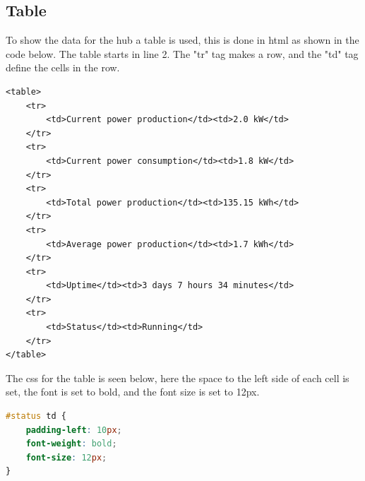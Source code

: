 \subsection{Table}
To show the data for the hub a table is used, this is done in html as shown in the code below. The table starts in line 2. The "tr" tag makes a row, and the "td" tag define the cells in the row.
\begin{lstlisting}
<table>
	<tr>
		<td>Current power production</td><td>2.0 kW</td>
	</tr>
	<tr>
		<td>Current power consumption</td><td>1.8 kW</td>
	</tr>
	<tr>
		<td>Total power production</td><td>135.15 kWh</td>
	</tr>
	<tr>
		<td>Average power production</td><td>1.7 kWh</td>
	</tr>
	<tr>
		<td>Uptime</td><td>3 days 7 hours 34 minutes</td>
	</tr>
	<tr>
		<td>Status</td><td>Running</td>
	</tr>
</table>
\end{lstlisting}
The css for the table is seen below, here the space to the left side of each cell is set, the font is set to bold, and the font size is set to 12px.
\begin{lstlisting}[language=CSS]
#status td {
	padding-left: 10px;
	font-weight: bold;
	font-size: 12px;
}
\end{lstlisting}

